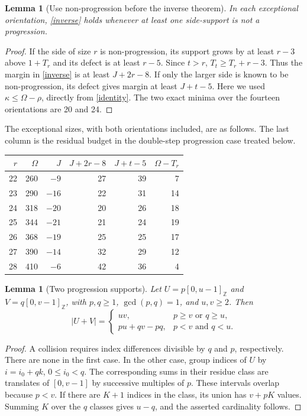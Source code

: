 \documentclass[11pt,a4paper]{article}
\newcommand{\Z}{\mathbb Z}
\newtheorem{lemma}[theorem]{Lemma}
\begin{document}
\begin{lemma}[Use non-progression before the inverse theorem]\label{nonapgate}
In each exceptional orientation, \eqref{inverse} holds whenever at
least one side-support is not a progression.
\end{lemma}
\begin{proof}
If the side of size $r$ is non-progression, its support grows by at
least $r-3$ above $1+T_r$ and its defect is at least $r-5$.
Since $t>r$, $T_t\ge T_r+r-3$. Thus the margin in \eqref{inverse}
is at least $J+2r-8$. If only the larger side is known to be
non-progression, its defect gives margin at least $J+t-5$.
Here we used $\kappa\le\Omega-\rho$, directly from \eqref{identity}.
The two exact minima over the fourteen orientations are 20 and 24.
\end{proof}
The exceptional sizes, with both orientations included, are as follows.
The last column is the residual budget in the double-step progression
case treated below.
\begin{center}\small
\begin{tabular}{rrrrrr}\toprule
$r$&$\Omega$&$J$&$J+2r-8$&$J+t-5$&$\Omega-T_r$\\\midrule
22&260&$-9$&27&39&7\\
23&290&$-16$&22&31&14\\
24&318&$-20$&20&26&18\\
25&344&$-21$&21&24&19\\
26&368&$-19$&25&25&17\\
27&390&$-14$&32&29&12\\
28&410&$-6$&42&36&4\\\bottomrule
\end{tabular}
\end{center}

\begin{lemma}[Two progression supports]\label{AP}
Let $U=p[0,u-1]_{\Z}$ and $V=q[0,v-1]_{\Z}$, with
$p,q\ge1$, $\gcd(p,q)=1$, and $u,v\ge2$. Then
\[
 |U+V|=\begin{cases}
 uv,&p\ge v\text{ or }q\ge u,\\
 pu+qv-pq,&p<v\text{ and }q<u.
 \end{cases}
\]
\end{lemma}
\begin{proof}
A collision requires index differences divisible by $q$ and $p$,
respectively. There are none in the first case. In the other case,
group indices of $U$ by $i=i_0+qk$, $0\le i_0<q$.
The corresponding sums in their residue class are translates of
$[0,v-1]$ by successive multiples of $p$. These intervals overlap
because $p<v$. If there are $K+1$ indices in the class, its union has
$v+pK$ values. Summing $K$ over the $q$ classes gives $u-q$,
and the asserted cardinality follows.
\end{proof}
\end{document}
